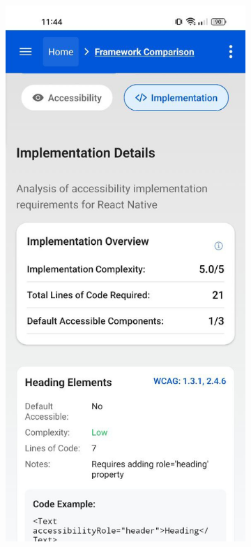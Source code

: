 \begin{figure}[ht]
    \centering
    \begin{subfigure}[b]{0.48\textwidth}
        \centering
        \includegraphics[width=\linewidth, alt={Implementation Details tab showing feature comparisons}]{img/implementation2.jpg}

\end{subfigure}
\end{figure}
